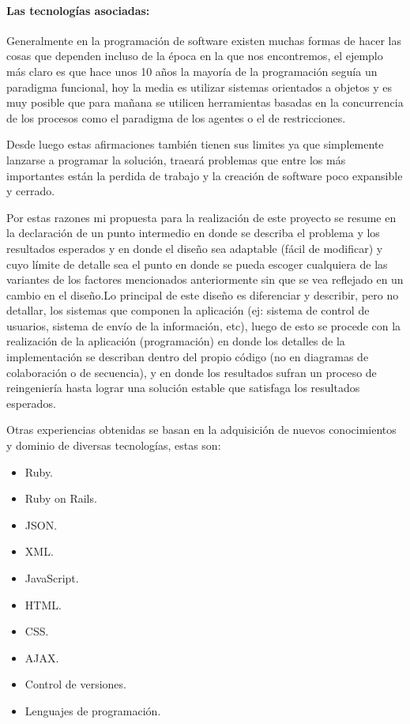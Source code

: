 \paragraph{Las tecnologías asociadas:}
Generalmente en la programación de software existen muchas formas de hacer las cosas que dependen incluso de la época en la que nos encontremos, el ejemplo más claro es que hace unos 10 años la mayoría de la programación seguía un paradigma funcional, hoy la media es utilizar sistemas orientados a objetos y es muy posible que para mañana se utilicen herramientas basadas en la concurrencia de los procesos como el paradigma de los agentes o el de restricciones.


Desde luego estas afirmaciones también tienen sus limites ya que simplemente lanzarse a programar la solución, traeará problemas que entre los más importantes están la perdida de trabajo y la creación de software poco expansible y cerrado.

Por estas razones mi propuesta para la realización de este proyecto se resume en la declaración de un punto intermedio en donde se describa el problema y los resultados esperados y en donde el diseño sea adaptable (fácil de modificar) y cuyo límite de detalle sea el punto en donde se pueda escoger cualquiera de las variantes de los factores mencionados anteriormente sin que se vea reflejado en un cambio en el diseño.\newline Lo principal de este diseño es diferenciar y describir, pero no detallar, los sistemas que componen la aplicación (ej: sistema de control de usuarios, sistema de envío de la información, etc), luego de esto se procede con la realización de la aplicación (programación) en donde los detalles de la implementación se describan dentro del propio código (no en diagramas de colaboración o de secuencia), y en donde los resultados sufran un proceso de reingeniería hasta lograr una solución estable que satisfaga los resultados esperados.

Otras experiencias obtenidas se basan en la adquisición de nuevos conocimientos y dominio de diversas tecnologías, estas son:

\begin{itemize}
	\item Ruby.
	\item Ruby on Rails.
	\item JSON.
	\item XML.
	\item JavaScript.
	\item HTML.
	\item CSS.
	\item AJAX.
	\item Control de versiones.
	\item Lenguajes de programación.
\end{itemize}

